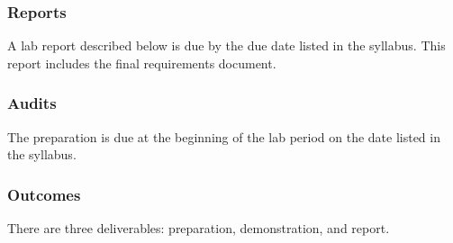 \documentclass[twoside]{article}
\begin{document}
\subsubsection*{Reports} 
A lab report described below is due by the due date listed in the syllabus. This report includes the final requirements document. 
 
\subsubsection*{Audits} 
The preparation is due at the beginning of the lab period on the date listed in the syllabus. 
 
\subsubsection*{Outcomes}
There are three deliverables: preparation, demonstration, and report.
\end{document}
